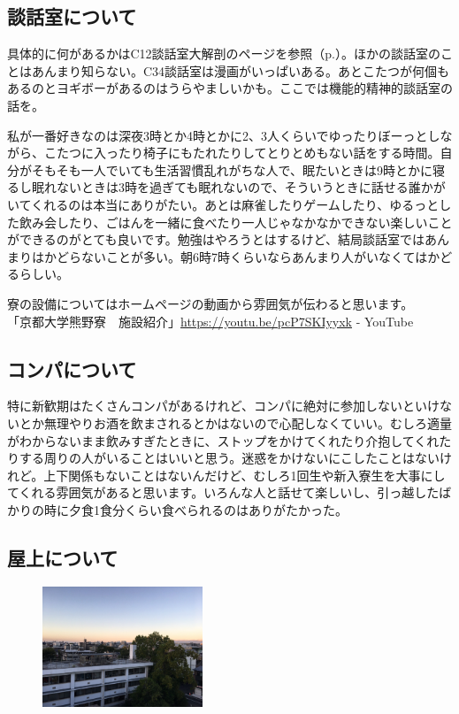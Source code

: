 \subsection{談話室について}
具体的に何があるかはC12談話室大解剖のページを参照（p.\pageref{daikaibo_danwa}）。ほかの談話室のことはあんまり知らない。C34談話室は漫画がいっぱいある。あとこたつが何個もあるのとヨギボーがあるのはうらやましいかも。ここでは機能的精神的談話室の話を。

私が一番好きなのは深夜3時とか4時とかに2、3人くらいでゆったりぼーっとしながら、こたつに入ったり椅子にもたれたりしてとりとめもない話をする時間。自分がそもそも一人でいても生活習慣乱れがちな人で、眠たいときは9時とかに寝るし眠れないときは3時を過ぎても眠れないので、そういうときに話せる誰かがいてくれるのは本当にありがたい。あとは麻雀したりゲームしたり、ゆるっとした飲み会したり、ごはんを一緒に食べたり一人じゃなかなかできない楽しいことができるのがとても良いです。勉強はやろうとはするけど、結局談話室ではあんまりはかどらないことが多い。朝6時7時くらいならあんまり人がいなくてはかどるらしい。

寮の設備についてはホームページの動画から雰囲気が伝わると思います。\\
「京都大学熊野寮　施設紹介」\url{https://youtu.be/pcP7SKIyyxk} - YouTube

\subsection{コンパについて}
特に新歓期はたくさんコンパがあるけれど、コンパに絶対に参加しないといけないとか無理やりお酒を飲まされるとかはないので心配しなくていい。むしろ適量がわからないまま飲みすぎたときに、ストップをかけてくれたり介抱してくれたりする周りの人がいることはいいと思う。迷惑をかけないにこしたことはないけれど。上下関係もないことはないんだけど、むしろ1回生や新入寮生を大事にしてくれる雰囲気があると思います。いろんな人と話せて楽しいし、引っ越したばかりの時に夕食1食分くらい食べられるのはありがたかった。

\subsection{屋上について}
\begin{figure}
  \centering
  \includegraphics[width=4.8cm]{gazo/okujo.pdf}
\end{figure}


